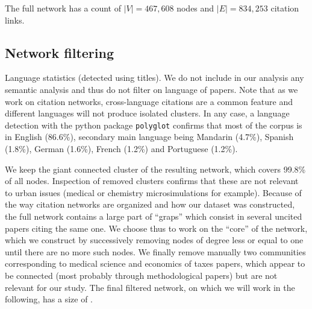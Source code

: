 The full network has a count of $\left|V\right|= 467,608$ nodes and $\left|E\right|=834,253$ citation links. 


\subsection*{Network filtering}

Language statistics (detected using titles). We do not include in our analysis any semantic analysis and thus do not filter on language of papers. Note that as we work on citation networks, cross-language citations are a common feature and different languages will not produce isolated clusters. In any case, a language detection with the python package \texttt{polyglot} confirms that most of the corpus is in English (86.6\%), secondary main language being Mandarin (4.7\%), Spanish (1.8\%), German (1.6\%), French (1.2\%) and Portuguese (1.2\%).





We keep the giant connected cluster of the resulting network, which covers 99.8\% of all nodes.
 Inspection of removed clusters confirms that these are not relevant to urban issues (medical or chemistry microsimulations for example). Because of the way citation networks are organized and how our dataset was constructed, the full network contains a large part of ``graps'' which consist in several uncited papers citing the same one. We choose thus to work on the ``core'' of the network, which we construct by successively removing nodes of degree less or equal to one until there are no more such nodes. We finally remove manually two communities corresponding to medical science and economics of taxes papers, which appear to be connected (most probably through methodological papers) but are not relevant for our study. The final filtered network, on which we will work in the following, has a size of %
  .


